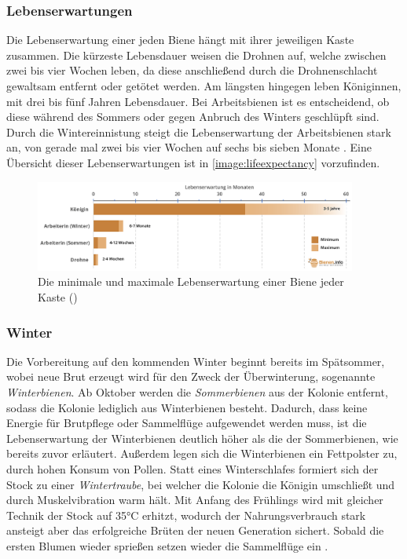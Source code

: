 \newpage
\subsubsection{Lebenserwartungen}
Die Lebenserwartung einer jeden Biene hängt mit ihrer jeweiligen Kaste zusammen. Die kürzeste Lebensdauer weisen die Drohnen auf, welche zwischen zwei bis vier Wochen leben, da diese anschließend durch die Drohnenschlacht gewaltsam entfernt oder getötet werden. Am längsten hingegen leben Königinnen, mit drei bis fünf Jahren Lebensdauer. Bei Arbeitsbienen ist es entscheidend, ob diese während des Sommers oder gegen Anbruch des Winters geschlüpft sind. Durch die Wintereinnistung steigt die Lebenserwartung der Arbeitsbienen stark an, von gerade mal zwei bis vier Wochen auf sechs bis sieben Monate \cite*[]{bees:lifeexpectancy}. Eine Übersicht dieser Lebenserwartungen ist in \autoref{image:lifeexpectancy} vorzufinden.

\begin{figure}
    \begin{center}
        \includegraphics[width=400px]{0.bilder/lifeexpectancy.png}
    \end{center}
    \caption{Die minimale und maximale Lebenserwartung einer Biene jeder Kaste (\cite[]{bees:lifeexpectancy})} \label{image:lifeexpectancy}
\end{figure}

\subsubsection{Winter}
Die Vorbereitung auf den kommenden Winter beginnt bereits im Spätsommer, wobei neue Brut erzeugt wird für den Zweck der Überwinterung, sogenannte \textit{Winterbienen}. Ab Oktober werden die \textit{Sommerbienen} aus der Kolonie entfernt, sodass die Kolonie lediglich aus Winterbienen besteht. Dadurch, dass keine Energie für Brutpflege oder Sammelflüge aufgewendet werden muss, ist die Lebenserwartung der Winterbienen deutlich höher als die der Sommerbienen, wie bereits zuvor erläutert. Außerdem legen sich die Winterbienen ein Fettpolster zu, durch hohen Konsum von Pollen. Statt eines Winterschlafes formiert sich der Stock zu einer \textit{Wintertraube}, bei welcher die Kolonie die Königin umschließt und durch Muskelvibration warm hält. Mit Anfang des Frühlings wird mit gleicher Technik der Stock auf 35°C erhitzt, wodurch der Nahrungsverbrauch stark ansteigt aber das erfolgreiche Brüten der neuen Generation sichert. Sobald die ersten Blumen wieder sprießen setzen wieder die Sammelflüge ein \cite*[]{bees:winter}.